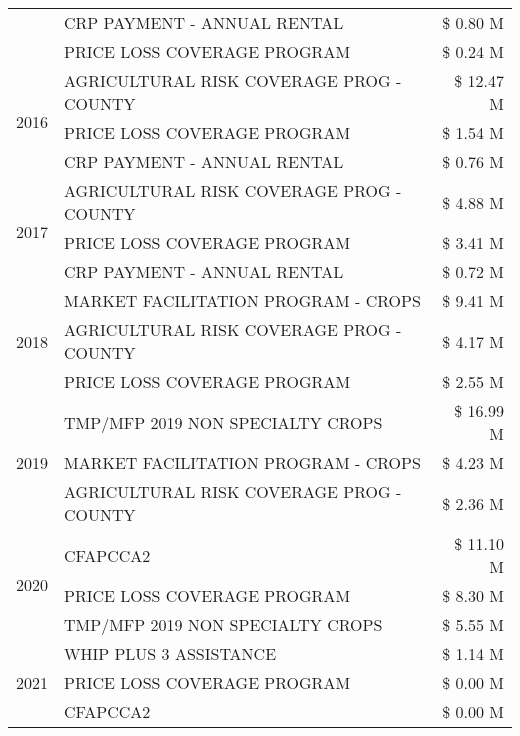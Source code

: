 \begin{tabular}{llr}
 & CRP PAYMENT - ANNUAL RENTAL & \$ 0.80 M \\
 & PRICE LOSS COVERAGE PROGRAM & \$ 0.24 M \\
\cline{1-3}
\multirow[t]{3}{*}{2016} & AGRICULTURAL RISK COVERAGE PROG - COUNTY & \$ 12.47 M \\
 & PRICE LOSS COVERAGE PROGRAM & \$ 1.54 M \\
 & CRP PAYMENT - ANNUAL RENTAL & \$ 0.76 M \\
\cline{1-3}
\multirow[t]{3}{*}{2017} & AGRICULTURAL RISK COVERAGE PROG - COUNTY & \$ 4.88 M \\
 & PRICE LOSS COVERAGE PROGRAM & \$ 3.41 M \\
 & CRP PAYMENT - ANNUAL RENTAL & \$ 0.72 M \\
\cline{1-3}
\multirow[t]{3}{*}{2018} & MARKET FACILITATION PROGRAM - CROPS & \$ 9.41 M \\
 & AGRICULTURAL RISK COVERAGE PROG - COUNTY & \$ 4.17 M \\
 & PRICE LOSS COVERAGE PROGRAM & \$ 2.55 M \\
\cline{1-3}
\multirow[t]{3}{*}{2019} & TMP/MFP 2019 NON SPECIALTY CROPS & \$ 16.99 M \\
 & MARKET FACILITATION PROGRAM - CROPS & \$ 4.23 M \\
 & AGRICULTURAL RISK COVERAGE PROG - COUNTY & \$ 2.36 M \\
\cline{1-3}
\multirow[t]{3}{*}{2020} & CFAPCCA2 & \$ 11.10 M \\
 & PRICE LOSS COVERAGE PROGRAM & \$ 8.30 M \\
 & TMP/MFP 2019 NON SPECIALTY CROPS & \$ 5.55 M \\
\cline{1-3}
\multirow[t]{3}{*}{2021} & WHIP PLUS 3 ASSISTANCE & \$ 1.14 M \\
 & PRICE LOSS COVERAGE PROGRAM & \$ 0.00 M \\
 & CFAPCCA2 & \$ 0.00 M \\
\cline{1-3}
\bottomrule
\end{tabular}
